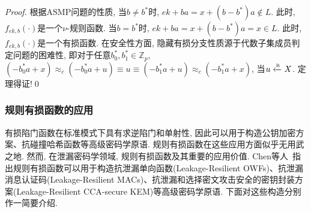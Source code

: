 \begin{proof}
根据ASMP问题的性质, 当$b \neq b^*$时, $ek + ba= x+(b-b^*)a \notin L$. 此时, $f_{ek,b}(\cdot)$是一个$\nu$-规则函数. 当$b = b^*$时, $ek + ba= x+(b-b^*)a = x \in L$. 此时, $f_{ek,b}(\cdot)$是一个有损函数. 
在安全性方面, 隐藏有损分支性质源于代数子集成员判定问题的困难性, 即对于任意$b_0^*, b_1^* \in \mathbb{Z}_p$, $(-b_0^*a + x) \approx_c (-b_0^*a + u) \equiv u 
\equiv (-b_1^*a + u) \approx_c (-b_1^*a + x)$, 当$u \xleftarrow{\textup{\tiny R}} X$. 定理得证!\qed 
\end{proof}

\subsubsection{规则有损函数的应用}
有损陷门函数在标准模式下具有求逆陷门和单射性, 因此可以用于构造公钥加密方案、抗碰撞哈希函数等高级密码学原语. 规则有损函数在这些应用方面似乎无用武之地. 然而, 在泄漏密码学领域, 规则有损函数及其重要的应用价值. Chen等人~\cite{Chen-TCS-2018}指出规则有损函数可以用于构造抗泄漏单向函数(Leakage-Resilient OWFs)、抗泄漏消息认证码(Leakage-Resilient MACs)、抗泄漏和选择密文攻击安全的密钥封装方案(Leakage-Resilient CCA-secure KEM)等高级密码学原语. 下面对这些构造分别作一简要介绍.

